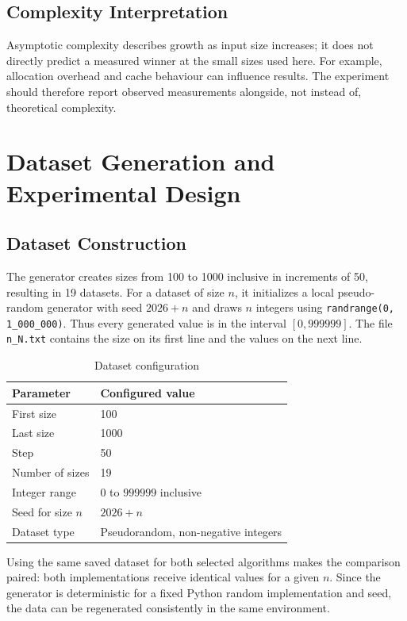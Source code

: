 \documentclass[12pt,a4paper,oneside]{report}
\begin{document}
\section{Complexity Interpretation}
Asymptotic complexity describes growth as input size increases; it does not directly predict a measured winner at the small sizes used here. For example, allocation overhead and cache behaviour can influence results. The experiment should therefore report observed measurements alongside, not instead of, theoretical complexity.

\chapter{Dataset Generation and Experimental Design}
\section{Dataset Construction}
The generator creates sizes from 100 to 1000 inclusive in increments of 50, resulting in 19 datasets. For a dataset of size $n$, it initializes a local pseudo-random generator with seed $2026+n$ and draws $n$ integers using \texttt{randrange(0, 1\_000\_000)}. Thus every generated value is in the interval $[0,999999]$. The file \texttt{n\_N.txt} contains the size on its first line and the values on the next line.
\begin{table}[H]\centering\caption{Dataset configuration}\begin{tabular}{ll}\toprule Parameter & Configured value\\\midrule First size & 100\\ Last size & 1000\\ Step & 50\\ Number of sizes & 19\\ Integer range & $0$ to $999999$ inclusive\\ Seed for size $n$ & $2026+n$\\ Dataset type & Pseudorandom, non-negative integers\\\bottomrule\end{tabular}\end{table}
Using the same saved dataset for both selected algorithms makes the comparison paired: both implementations receive identical values for a given $n$. Since the generator is deterministic for a fixed Python random implementation and seed, the data can be regenerated consistently in the same environment.
\end{document}

